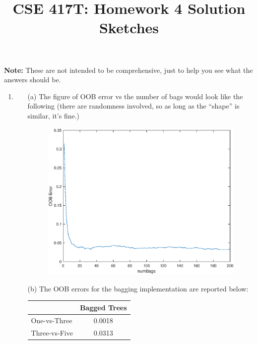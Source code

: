 \documentclass[10pt]{article}
\begin{document}
\title{CSE 417T: Homework 4 Solution Sketches}

\maketitle

\noindent \textbf{Note:} These are not intended to be comprehensive,
just to help you see what the answers should be.


\begin{enumerate}

\item

  \begin{itemize}
    \item[(a)] The figure of OOB error vs the number of bags would look like the following (there are randomness involved, so as long as the ``shape'' is similar, it's fine.)
      \begin{figure}[h]
        \begin{center}
        \includegraphics[width=.5\textwidth]{oob-vs-numbags.eps}
        \end{center}
      \end{figure}

    \item[(b)] 
        The OOB errors for the bagging implementation are reported below:
        \begin{center}
        \begin{tabular}{l|c}
                & Bagged Trees \\
            \hline
            One-vs-Three & 0.0018 \\
            \hline
            Three-vs-Five & 0.0313
          \end{tabular}
          \end{center}



\end{itemize}
\end{enumerate}
\end{document}
